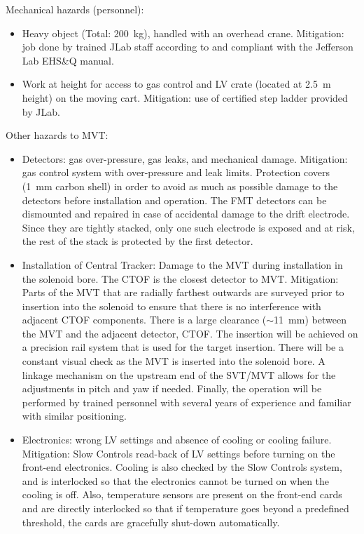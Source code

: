 Mechanical hazards (personnel):
\begin{itemize}
\item Heavy object (Total: 200~kg), handled with an overhead crane. Mitigation: job done by 
trained JLab staff according to and compliant with the Jefferson Lab EHS\&Q manual.
\item Work at height for access to gas control and LV crate (located at 2.5~m height) on the 
moving cart. Mitigation: use of certified step ladder provided by JLab.
\end{itemize}

Other hazards to MVT:
\begin{itemize}
\item Detectors: gas over-pressure, gas leaks, and mechanical damage. Mitigation: gas control 
system with over-pressure and leak limits. Protection covers (1~mm carbon shell) in order to 
avoid as much as possible damage to the detectors before installation and operation. The FMT 
detectors can be dismounted and repaired in case of accidental damage to the drift electrode. 
Since they are tightly stacked, only one such electrode is exposed and at risk, the rest of 
the stack is protected by the first detector.
\item Installation of Central Tracker: Damage to the MVT during installation in the solenoid 
bore. The CTOF is the closest detector to MVT. Mitigation: Parts of the MVT that are radially 
farthest outwards are surveyed prior to insertion into the solenoid to ensure that there is 
no interference with adjacent CTOF components. There is a large clearance ($\sim$11~mm) between 
the MVT and the adjacent detector, CTOF. The insertion will be achieved on a precision rail 
system that is used for the target insertion. There will be a constant visual check as the MVT 
is inserted into the solenoid bore. A linkage mechanism on the upstream end of the SVT/MVT allows 
for the adjustments in pitch and yaw if needed. Finally, the operation will be performed by 
trained personnel with several years of experience and familiar with similar positioning.
\item Electronics: wrong LV settings and absence of cooling or cooling failure. Mitigation: Slow 
Controls read-back of LV settings before turning on the front-end electronics. Cooling is also 
checked by the Slow Controls system, and is interlocked so that the electronics cannot be turned 
on when the cooling is off. Also, temperature sensors are present on the front-end cards and are 
directly interlocked so that if temperature goes beyond a predefined threshold, the cards are 
gracefully shut-down automatically.
\end{itemize}

